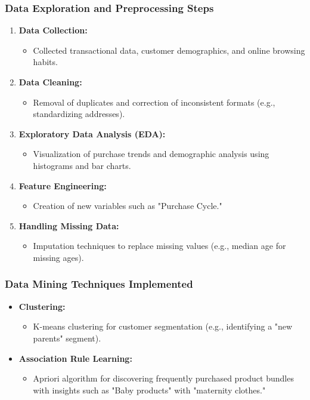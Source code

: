 \documentclass[aspectratio=169]{beamer}
\begin{document}
\begin{frame}[fragile]
    \frametitle{Data Exploration and Preprocessing Steps}
    \begin{enumerate}
        \item \textbf{Data Collection:} 
            \begin{itemize}
                \item Collected transactional data, customer demographics, and online browsing habits.
            \end{itemize}
        \item \textbf{Data Cleaning:}
            \begin{itemize}
                \item Removal of duplicates and correction of inconsistent formats (e.g., standardizing addresses).
            \end{itemize}
        \item \textbf{Exploratory Data Analysis (EDA):}
            \begin{itemize}
                \item Visualization of purchase trends and demographic analysis using histograms and bar charts.
            \end{itemize}
        \item \textbf{Feature Engineering:}
            \begin{itemize}
                \item Creation of new variables such as "Purchase Cycle."
            \end{itemize}
        \item \textbf{Handling Missing Data:}
            \begin{itemize}
                \item Imputation techniques to replace missing values (e.g., median age for missing ages).
            \end{itemize}
    \end{enumerate}
\end{frame}

\begin{frame}[fragile]
    \frametitle{Data Mining Techniques Implemented}
    \begin{itemize}
        \item \textbf{Clustering:} 
            \begin{itemize}
                \item K-means clustering for customer segmentation (e.g., identifying a "new parents" segment).
            \end{itemize}
        \item \textbf{Association Rule Learning:} 
            \begin{itemize}
                \item Apriori algorithm for discovering frequently purchased product bundles with insights such as "Baby products" with "maternity clothes."
            \end{itemize}
    \end{itemize}
\end{frame}
\end{document}
